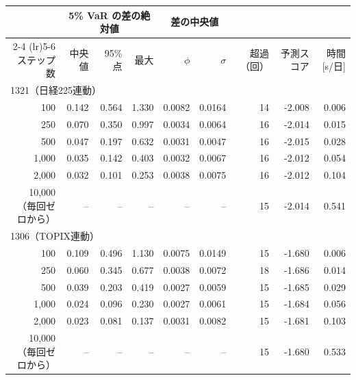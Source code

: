 \begin{tabular}{rrrrrrrrr}
\toprule
 & \multicolumn{3}{c}{5\% VaR の差の絶対値} & \multicolumn{2}{c}{差の中央値} & & & \\
\cmidrule(lr){2-4} \cmidrule(lr){5-6}
ステップ数 & 中央値 & 95\% 点 & 最大 & $\phi$ & $\sigma$ & 超過（回） & 予測スコア & 時間[s/日] \\
\midrule
\multicolumn{9}{l}{1321（日経225連動）} \\
100 & 0.142 & 0.564 & 1.330 & 0.0082 & 0.0164 & 14 & -2.008 & 0.006 \\
250 & 0.070 & 0.350 & 0.997 & 0.0034 & 0.0064 & 16 & -2.014 & 0.015 \\
500 & 0.047 & 0.197 & 0.632 & 0.0031 & 0.0047 & 16 & -2.015 & 0.028 \\
1,000 & 0.035 & 0.142 & 0.403 & 0.0032 & 0.0067 & 16 & -2.012 & 0.054 \\
2,000 & 0.032 & 0.101 & 0.253 & 0.0038 & 0.0075 & 16 & -2.012 & 0.104 \\
10,000（毎回ゼロから） & -- & -- & -- & -- & -- & 15 & -2.014 & 0.541 \\
\midrule
\multicolumn{9}{l}{1306（TOPIX連動）} \\
100 & 0.109 & 0.496 & 1.130 & 0.0075 & 0.0149 & 15 & -1.680 & 0.006 \\
250 & 0.060 & 0.345 & 0.677 & 0.0038 & 0.0072 & 18 & -1.686 & 0.014 \\
500 & 0.039 & 0.203 & 0.419 & 0.0027 & 0.0059 & 15 & -1.685 & 0.029 \\
1,000 & 0.024 & 0.096 & 0.230 & 0.0027 & 0.0061 & 15 & -1.684 & 0.056 \\
2,000 & 0.023 & 0.081 & 0.137 & 0.0031 & 0.0082 & 15 & -1.681 & 0.103 \\
10,000（毎回ゼロから） & -- & -- & -- & -- & -- & 15 & -1.680 & 0.533 \\
\bottomrule
\end{tabular}
